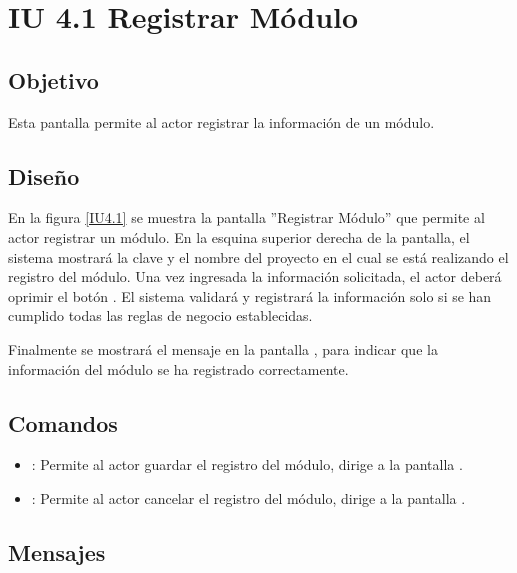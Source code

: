 \section{IU 4.1 Registrar Módulo}

\subsection{Objetivo}
	Esta pantalla permite al actor registrar la información de un módulo.
\subsection{Diseño}
	En la figura \ref{IU4.1} se muestra la pantalla ''Registrar Módulo'' que permite al actor registrar un módulo. En la esquina superior derecha de la pantalla, el sistema mostrará la clave y el nombre del proyecto en el cual se está realizando el registro del módulo.
	Una vez ingresada la información solicitada, el actor deberá oprimir el botón . El sistema validará y registrará la información solo si se han cumplido todas las reglas de negocio establecidas.
	
	Finalmente se mostrará el mensaje  en la pantalla , para indicar que la información del módulo se ha registrado correctamente.
\label{IU4.1}
\subsection{Comandos}
\begin{itemize}
	\item {}: Permite al actor guardar el registro del módulo, dirige a la pantalla .
	\item {}: Permite al actor cancelar el registro del módulo, dirige a la pantalla .
\end{itemize}

\subsection{Mensajes}

